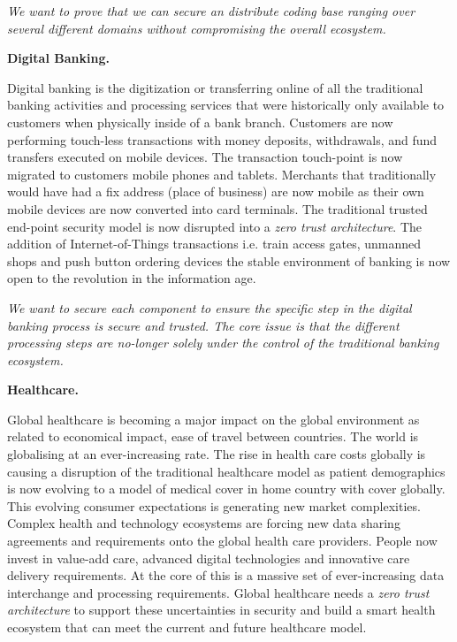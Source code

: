 \begin{Workpackage}{\thewpno}
\begin{Task}
\emph{We want to prove that we can secure an distribute coding base ranging over several different domains without compromising the overall ecosystem.}

\textbf{Digital Banking.}

Digital banking is the digitization or transferring online of all the traditional banking activities and processing services that were historically only available to customers when physically inside of a bank branch. Customers are now performing touch-less transactions with money deposits, withdrawals, and fund transfers executed on mobile devices. The transaction touch-point is now migrated to customers mobile phones and tablets. Merchants that traditionally would have had a fix address (place of business) are now mobile as their own mobile devices are now converted into card terminals. The traditional trusted end-point security model is now disrupted into a \emph{zero trust architecture}. The addition of Internet-of-Things transactions i.e. train access gates, unmanned shops and push button ordering devices the stable environment of banking is now open to the revolution in the information age.

\emph{We want to secure each component to ensure the specific step in the digital banking process is secure and trusted. The core issue is that the different processing steps are no-longer solely under the control of the traditional banking ecosystem.}

\textbf{Healthcare.} 

Global healthcare is becoming a major impact on the global environment as related to economical impact, ease of travel between countries. The world is globalising at an ever-increasing rate. The rise in health care costs globally is causing a disruption of the traditional healthcare model as patient demographics is now evolving to a model of medical cover in home country with cover globally. This evolving consumer expectations is generating new market complexities. Complex health and technology ecosystems are forcing new data sharing agreements and requirements onto the global health care providers. People now invest in value-add care, advanced digital technologies and innovative care delivery requirements. At the core of this is a massive set of ever-increasing data interchange and processing requirements. Global healthcare needs a \emph{zero trust architecture} to support these uncertainties in security and build a smart health ecosystem that can meet the current and future healthcare model.


\end{Task}
\end{Workpackage}
